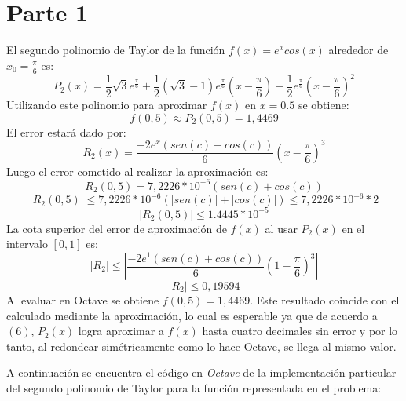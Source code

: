 \documentclass[titlepage,a4paper]{article}
\begin{document}
\section{Parte 1}\label{sec:parte1}
El segundo polinomio de Taylor de la función $ f(x) = e^xcos(x) $ alrededor de $ x_0 = \frac{\pi}{6} $ es:
	\begin{equation}
	P_2(x) = \frac{1}{2}\sqrt{3}e^{\frac{\pi}{6}} + \frac{1}{2}(\sqrt{3} - 1)e^{\frac{\pi}{6}}(x - \frac{\pi}{6}) - \frac{1}{2}e^{\frac{\pi}{6}}(x - \frac{\pi}{6})^2
	\end{equation}
Utilizando este polinomio para aproximar $ f(x) $ en $ x = 0.5 $ se obtiene:
	\begin{equation}
	f(0,5) \approx P_2(0,5) = 1,4469
	\end{equation}
El error estará dado por:
	\begin{equation}
	R_2(x) = \frac{-2e^{x}(sen(c) + cos(c))}{6}(x - \frac{\pi}{6})^3
	\end{equation}
Luego el error cometido al realizar la aproximación es:
	\begin{equation*}
	R_2(0,5) = 7,2226*10^{-6}(sen(c) + cos(c))
	\end{equation*}
	\begin{equation*}
	| R_2(0,5) | \leq 7,2226*10^{-6}(|sen(c)| + |cos(c)|) \leq 7,2226*10^{-6}*2
	\end{equation*}
	\begin{equation}
	| R_2(0,5) | \leq 1.4445*10^{-5}
	\end{equation}
La cota superior del error de aproximación de $ f(x) $ al usar $ P_2(x) $ en el intervalo $ [0, 1] $ es:
	\begin{equation*}
	| R_2 | \leq | \frac{-2e^{1}(sen(c) + cos(c))}{6}(1 - \frac{\pi}{6})^3 |
	\end{equation*}
	\begin{equation}
	| R_2 | \leq 0,19594
	\end{equation}
Al evaluar en Octave se obtiene $ f(0,5) = 1,4469 $. Este resultado coincide con el calculado mediante la aproximación, lo cual es esperable ya que de acuerdo a $(6)$, $P_2(x)$ logra aproximar a $f(x)$ hasta cuatro decimales sin error y por lo tanto, al redondear simétricamente como lo hace Octave, se llega al mismo valor.

A continuación se encuentra el código en \emph{Octave} de la implementación particular del segundo polinomio de Taylor para la función representada en el problema:
			
\end{document}
